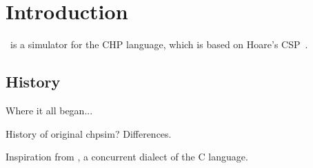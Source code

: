 
\section{Introduction}
\label{sec:intro}


\chpsim\ is a simulator for the CHP language,
which is based on Hoare's CSP~\cite{ref:csp}.


\subsection{History}
\label{sec:intro:history}

Where it all began...

History of original chpsim?  Differences.  

Inspiration from , a concurrent dialect of the C language.  




